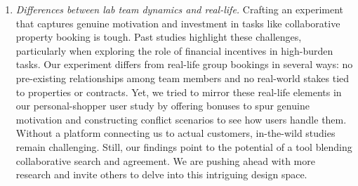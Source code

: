 \begin{enumerate}
    \item \textit{Differences between lab team dynamics and real-life.} 
    Crafting an experiment that captures genuine motivation and investment in tasks like collaborative property booking is tough. Past studies highlight these challenges, particularly when exploring the role of financial incentives in high-burden tasks\cite{micro-incentives-motivation}. Our experiment differs from real-life group bookings in several ways: no pre-existing relationships among team members and no real-world stakes tied to properties or contracts. Yet, we tried to mirror these real-life elements in our personal-shopper user study by offering bonuses to spur genuine motivation and constructing conflict scenarios to see how users handle them. Without a platform connecting us to actual customers, in-the-wild studies remain challenging. Still, our findings point to the potential of a tool blending collaborative search and agreement. We are pushing ahead with more research and invite others to delve into this intriguing design space.
\end{enumerate}
